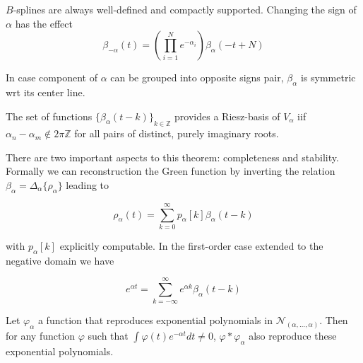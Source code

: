 \documentclass[a4paper, 11pt]{article}
\begin{document}
$B$-splines are always well-defined and compactly supported. Changing the sign of $\alpha$ has the effect
\begin{equation*}
  \beta_{-\alpha}(t) = \left( \prod_{i=1}^N e^{-\alpha_i} \right) \beta_{\alpha}(-t+N)
\end{equation*}

In case component of $\alpha$ can be grouped into opposite signs pair, $\beta_{\alpha}$ is symmetric wrt its center 
line. 

\begin{thm}{1}
  The set of functions ${\{\beta_{\alpha}(t-k)\}}_{k \in \mathbb{Z}}$ provides a Riesz-basis of $V_{\alpha}$ iif 
  $\alpha_n - \alpha_m \not\in 2\pi\mathbb{Z}$ for all pairs of distinct, purely imaginary roots.
\end{thm}

There are two important aspects to this theorem: completeness and stability. Formally we can reconstruction the Green 
function by inverting the relation $\beta_{\alpha} = \Delta_{\alpha}\{\rho_{\alpha}\}$ leading to 

\begin{equation*}
  \rho_{\alpha}(t) = \sum_{k=0}^{\infty} p_{\alpha}[k]\beta_{\alpha}(t-k)
\end{equation*}

with $p_{\alpha}[k]$ explicitly computable. In the first-order case extended to the negative domain we have

\begin{equation*}
  e^{\alpha t} = \sum_{k=-\infty}^{\infty} e^{\alpha k}\beta_{\alpha}(t-k)
\end{equation*}

\begin{prop}{2}
  Let $\varphi_{\alpha}$ a function that reproduces exponential polynomials in $\mathcal{N}_{(\alpha, \ldots, \alpha)}$.  
  Then for any function $\varphi$ such that $\int \varphi(t)e^{-\alpha t}dt \neq 0$, $\varphi * \varphi_{\alpha}$ also 
  reproduce these exponential polynomials.
\end{prop}
\end{document}
